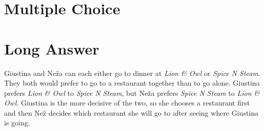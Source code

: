 \documentclass[addpoints, answers]{exam}
\begin{document}
\begin{questions}


\question[20] 

\section*{Multiple Choice}
\noindent{}


\section*{Long Answer}


\question 

Giustina and Ne\v{z}a can each either go to dinner at 
  \textit{Lion \& Owl} or \textit{Spice N Steam}.
They both would prefer to go to a restaurant together than to go alone.
Giustina prefers \textit{Lion \& Owl} to \textit{Spice N Steam}, 
  but Ne\v{z}a prefers \textit{Spice N Steam} to \textit{Lion \& Owl}.
Giustina is the more decisive of the two, 
so she chooses a restaurant first
and then Ne\v{z} decides which restaurant she will go to 
after seeing where Giustina is going.

\end{questions}
\end{document}
